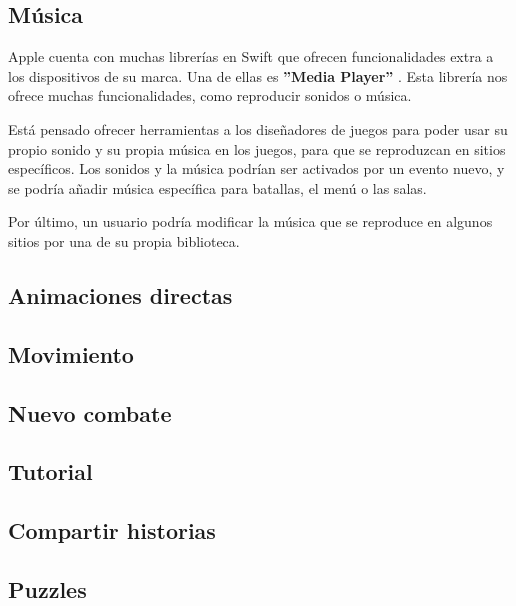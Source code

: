 \subsection{Música}
Apple cuenta con muchas librerías en Swift que ofrecen funcionalidades extra a los dispositivos de su marca. Una de ellas es \textbf{''Media Player''} \cite{mediaPlayer}.
Esta librería nos ofrece muchas funcionalidades, como reproducir sonidos o música.

Está pensado ofrecer herramientas a los diseñadores de juegos para poder usar su propio sonido y su propia música en los juegos, para que se reproduzcan en sitios específicos. Los sonidos y la música podrían ser activados por un evento nuevo, y se podría añadir música específica para batallas, el menú o las salas.

Por último, un usuario podría modificar la música que se reproduce en algunos sitios por una de su propia biblioteca.

\subsection{Animaciones directas}

\subsection{Movimiento}

\subsection{Nuevo combate}

\subsection{Tutorial}
 
\subsection{Compartir historias}

\subsection{Puzzles}

